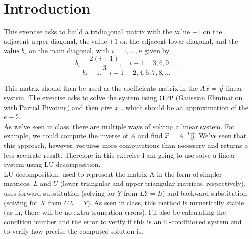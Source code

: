 \documentclass{article}
\newcommand{\code}{\texttt}
\begin{document}

\section{Introduction}\label{sec:intro}
This exercise asks to build a tridiagonal matrix with the value $-1$ on the adjacent upper diagonal, the value $+1$ on the adjacent lower diagonal, and the value $b_{i}$ on the main diagonal, with $i = 1, \ldots, n$ given by
$$b_i =\frac{2(i+1)}{3},\quad i + 1= 3, 6, 9,\ldots$$
$$b_i =1,\quad i + 1 = 2, 4, 5, 7, 8, \ldots$$

This matrix should then be used as the coefficients matrix in the $A\vec{x}=\vec{y}$ linear system. The exercise asks to solve the system using \code{GEPP} (Gaussian Elimination with Partial Pivoting) and then give $x_1$, which should be an approximation of the $e-2$.\\

As we've seen in class, there are multiple ways of solving a linear system. For example, we could compute the inverse of $A$ and find $\vec{x}=A^{-1}\vec{y}$. We've seen that this approach, however, requires more computations than necessary and returns a less accurate result. Therefore in this exercise I am going to use solve a linear system using LU decomposition.\\

LU decomposition, used to represent the matrix A in the form of simpler matrices, $L$ and $U$ (lower triangular and upper triangular matrices, respectively), uses forward substitution (solving for $Y$ from $LY=B$) and backward substitution (solving for $X$ from $UX = Y$). As seen in class, this method is numerically stable (as in, there will be no extra truncation errors). I'll also be calculating the condition number and the error to verify if this is an ill-conditioned system and to verify how precise the computed solution is.
\end{document}
